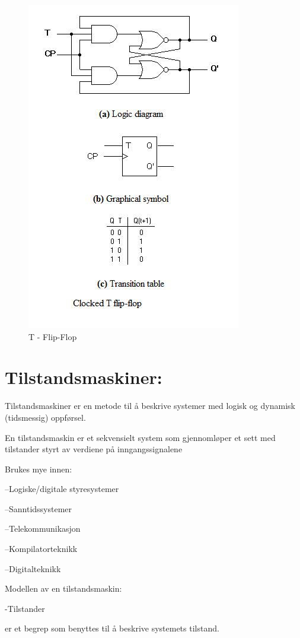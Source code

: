 \documentclass{article}
\begin{document}
	\begin{figure}[H]
		\includegraphics[scale = 0.6]{tFlip2.jpg}
		\caption{T - Flip-Flop}
	\end{figure}
	
	
	\section*{Tilstandsmaskiner:}
	Tilstandsmaskiner er en metode til å beskrive systemer med logisk og dynamisk (tidsmessig) oppførsel. 
	
	En tilstandsmaskin er et sekvensielt system som gjennomløper et sett med tilstander styrt av verdiene på inngangssignalene 
	
	Brukes mye innen: 
	
	–Logiske/digitale styresystemer 
	
	–Sanntidssystemer 
	
	–Telekommunikasjon 
	
	–Kompilatorteknikk 
	
	–Digitalteknikk 
	
	Modellen av en tilstandsmaskin:
	
	-Tilstander
	
	er et begrep som benyttes til å beskrive systemets tilstand. 
	 
\end{document}
